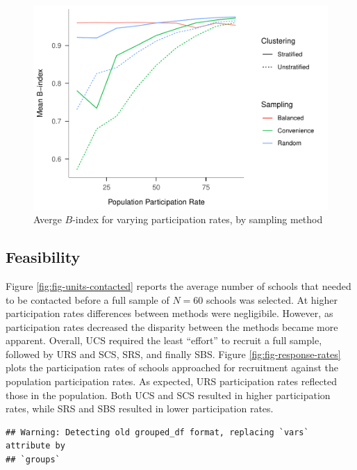 \documentclass[man,floatsintext]{apa6}
\begin{document}
\begin{figure}
\centering
\includegraphics{GenSamp_Paper_files/figure-latex/fig-avg-Bindex-1.pdf}
\caption{\label{fig:fig-avg-Bindex}Averge \(B\)-index for varying participation rates, by sampling method}
\end{figure}

\hypertarget{feasibility-1}{%
\subsection{Feasibility}\label{feasibility-1}}

Figure \ref{fig:fig-units-contacted} reports the average number of schools that needed to be contacted before a full sample of \(N = 60\) schools was selected. At higher participation rates differences between methods were negligibile. However, as participation rates decreased the disparity between the methods became more apparent. Overall, UCS required the least \enquote{effort} to recruit a full sample, followed by URS and SCS, SRS, and finally SBS. Figure \ref{fig:fig-response-rates} plots the participation rates of schools approached for recruitment against the population participation rates. As expected, URS participation rates reflected those in the population. Both UCS and SCS resulted in higher participation rates, while SRS and SBS resulted in lower participation rates.

\begin{verbatim}
## Warning: Detecting old grouped_df format, replacing `vars` attribute by
## `groups`
\end{verbatim}
\end{document}

